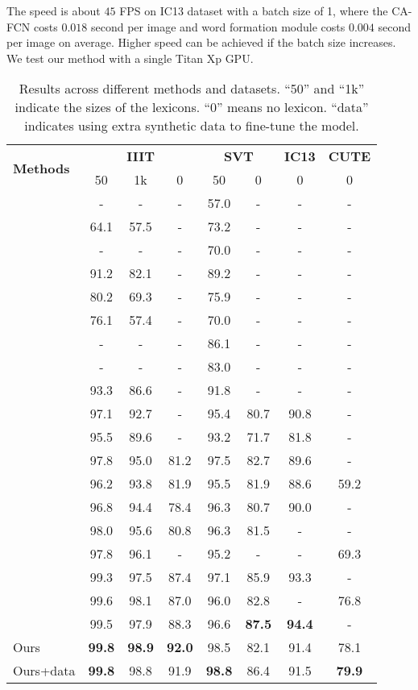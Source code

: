 \documentclass[letterpaper]{article} \usepackage{aaai19}  \usepackage{times}  \usepackage{helvet}  \usepackage{courier}  \usepackage{url}  \usepackage{graphicx}  \frenchspacing  \usepackage{multirow}
\begin{document}
The speed is about $45$ FPS on IC13 dataset with a batch size of 1, where the CA-FCN costs $0.018$ second per image and word formation module costs $0.004$ second per image on average. Higher speed can be achieved if the batch size increases. We test our method with a single Titan Xp GPU.


\begin{table*}[!ht]
\caption{Results across different methods and datasets. ``50'' and ``1k'' indicate the sizes of the lexicons. ``0'' means no lexicon. ``data'' indicates using extra synthetic data to fine-tune the model.}
\label{tab:performance}
\centering
\begin{tabular}{|l|ccc|cc|c|c|}
\hline 
\multirow{2}{*}{\textbf{Methods}}  & \multicolumn{3}{c|}{\textbf{IIIT}} & \multicolumn{2}{c|}{\textbf{SVT}}  & \textbf{IC13}  & \textbf{CUTE}\tabularnewline
\cline{2-8} 
& 50 & 1k & 0 & 50 & 0  & 0 & 0\tabularnewline
\hline 
\cite{DBLP:conf/iccv/WangBB11}  & - & - & - & 57.0 & -  & - & -\tabularnewline
\cite{DBLP:conf/bmvc/MishraAJ12}  & 64.1 & 57.5 & - & 73.2 & -  & - & -\tabularnewline
\cite{WangWCN12}  & - & - & - & 70.0 & -  & - & -\tabularnewline
\cite{AlmazanGFV14}  & 91.2 & 82.1 & - & 89.2 & - & - & -\tabularnewline
\cite{YaoBSL14}  & 80.2 & 69.3 & - & 75.9 & -  & - & -\tabularnewline
\cite{Rodriguez-Serrano15}  & 76.1 & 57.4 & - & 70.0 & - & - & -\tabularnewline
\cite{DBLP:conf/eccv/JaderbergVZ14}  & - & - & - & 86.1 & -  & - & -\tabularnewline
\cite{SuL14}  & - & - & - & 83.0 & - & - & -\tabularnewline
\cite{Gordo14}  & 93.3 & 86.6 & - & 91.8 & - & -  & -\tabularnewline
\cite{jaderberg2016reading}  & 97.1 & 92.7 & - & 95.4 & 80.7  & 90.8 & -\tabularnewline
\cite{JaderbergSVZ14b}  & 95.5 & 89.6 & - & 93.2 & 71.7  & 81.8 & -\tabularnewline
\cite{DBLP:journals/pami/ShiBY17} & 97.8 & 95.0 & 81.2 & 97.5 & 82.7  & 89.6 & -\tabularnewline
\cite{DBLP:conf/cvpr/ShiWLYB16}  & 96.2 & 93.8 & 81.9 & 95.5 & 81.9  & 88.6 & 59.2\tabularnewline
\cite{LeeO16}  & 96.8 & 94.4 & 78.4 & 96.3 & 80.7  & 90.0 & -\tabularnewline
\cite{DBLP:conf/nips/WangH17}  & 98.0 & 95.6 & 80.8 & 96.3 & 81.5  & - & -\tabularnewline
\cite{YangHZKG17} & 97.8 & 96.1 & - & 95.2 & - & - & 69.3\tabularnewline
\cite{ChengBXZPZ17}  & 99.3 & 97.5 & 87.4 & 97.1 & 85.9  & 93.3 & -\tabularnewline
\cite{cheng2018aon}  & 99.6 & 98.1 & 87.0 & 96.0 & 82.8  & - & 76.8\tabularnewline
\cite{bai2018edit}  & 99.5 & 97.9 & 88.3 & 96.6 & \textbf{87.5}  & \textbf{94.4} & -\tabularnewline
\hline 
Ours & \textbf{99.8} & \textbf{98.9} & \textbf{92.0} & 98.5 & 82.1  & 91.4 & 78.1 \tabularnewline
Ours+data  & \textbf{99.8}  & 98.8  & 91.9  & \textbf{98.8}  & 86.4  & 91.5 & \textbf{79.9} \tabularnewline
\hline 
\end{tabular}
\end{table*}
\end{document}
